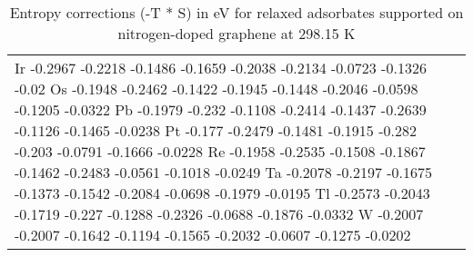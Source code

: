 \begin{table}[h]
\begin{tabular}{lr}
      Ir	-0.2967	-0.2218	-0.1486	-0.1659	-0.2038	-0.2134	-0.0723	-0.1326	-0.02
      Os	-0.1948	-0.2462	-0.1422	-0.1945	-0.1448	-0.2046	-0.0598	-0.1205	-0.0322
      Pb	-0.1979	-0.232	-0.1108	-0.2414	-0.1437	-0.2639	-0.1126	-0.1465	-0.0238
      Pt	-0.177	-0.2479	-0.1481	-0.1915	-0.282	-0.203	-0.0791	-0.1666	-0.0228
      Re	-0.1958	-0.2535	-0.1508	-0.1867	-0.1462	-0.2483	-0.0561	-0.1018	-0.0249
      Ta	-0.2078	-0.2197	-0.1675	-0.1373	-0.1542	-0.2084	-0.0698	-0.1979	-0.0195
      Tl	-0.2573	-0.2043	-0.1719	-0.227	-0.1288	-0.2326	-0.0688	-0.1876	-0.0332
      W	  -0.2007	-0.2007	-0.1642	-0.1194	-0.1565	-0.2032	-0.0607	-0.1275	-0.0202
      \hline
    \end{tabular}
    \caption{Entropy corrections (-T * S) in eV for relaxed adsorbates supported on nitrogen-doped graphene at 298.15 K}
    \label{si_table10}
\end{table}


